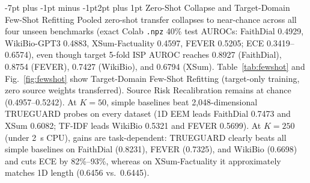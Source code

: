 \documentclass[10pt,twocolumn,letterpaper]{article}
\makeatletter
\renewcommand{\subsection}{\@startsection{subsection}{2}{\z@}%
  {-7pt plus -1pt minus -1pt}{2pt plus 1pt}%
  {\normalfont\normalsize\itshape\color{black}}}
\makeatother
\begin{document}
\begin{table}[t]
\centering
\caption{In-Domain 5-Fold Group-Preserving Cross-Validation With Dataset-Artifact Controls}
\label{tab:indomain}
\end{table}

\subsection{Zero-Shot Collapse and Target-Domain Few-Shot Refitting}
Pooled zero-shot transfer collapses to near-chance across all four unseen benchmarks (exact Colab \texttt{.npz} 40\% test AUROCs: FaithDial 0.4929, WikiBio-GPT3 0.4883, XSum-Factuality 0.4597, FEVER 0.5205; ECE 0.3419--0.6574), even though target 5-fold ISP AUROC reaches 0.8927 (FaithDial), 0.8754 (FEVER), 0.7427 (WikiBio), and 0.6794 (XSum). Table~\ref{tab:fewshot} and Fig.~\ref{fig:fewshot} show Target-Domain Few-Shot Refitting (target-only training, zero source weights transferred). Source Risk Recalibration remains at chance (0.4957--0.5242). At $K = 50$, simple baselines beat 2,048-dimensional TRUEGUARD probes on every dataset (1D EEM leads FaithDial 0.7473 and XSum 0.6082; TF-IDF leads WikiBio 0.5321 and FEVER 0.5699). At $K = 250$ (under 2~s CPU), gains are task-dependent: TRUEGUARD clearly beats all simple baselines on FaithDial (0.8231), FEVER (0.7325), and WikiBio (0.6698) and cuts ECE by 82\%--93\%, whereas on XSum-Factuality it approximately matches 1D length (0.6456 vs.\ 0.6445).
\end{document}
